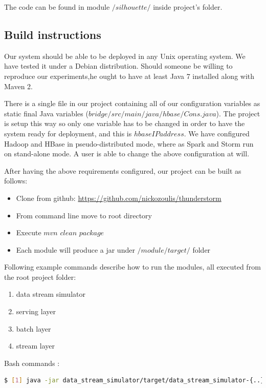 \documentclass{lmproj}
\begin{document}
The code can be found in module $/silhouette/$ inside project's folder.

\subsection{Build instructions}

Our system should be able to be deployed in any Unix operating system. We have tested it under a Debian distribution. Should someone be willing to reproduce our experiments,he ought to have at least Java 7 installed along with Maven 2. 

There is a single file in our project containing all of our configuration variables as static final Java variables ($bridge/src/main/java/hbase/Cons.java$). The project is setup this way so only one variable has to be changed in order to have the system ready for deployment, and this is $hbaseIPaddress$. We have configured Hadoop and HBase in pseudo-distributed mode, where as Spark and Storm run on stand-alone mode. A user is able to change the above configuration at will. 

After having the above requirements configured, our project can be built as follows:

\begin{itemize}
	\item Clone from github:   \url{https://github.com/nickozoulis/thunderstorm} 
	\item From command line move to root directory
	\item Execute $mvn$ $clean$ $package$ 
	\item Each module will produce a jar under $/module/target/$ folder
\end{itemize}

Following example commands describe how to run the modules, all executed from the root project folder:

\begin{enumerate}
	\item data stream simulator
	\item serving layer
	\item batch layer
	\item stream layer
\end{enumerate}

\noindent Bash commands :
\begin{lstlisting}[language=bash]
$ [1] java -jar data_stream_simulator/target/data_stream_simulator-{..}-jar-with-dependencies.jar -f {filepath to normalized dataset}
\end{lstlisting}
\end{document}
